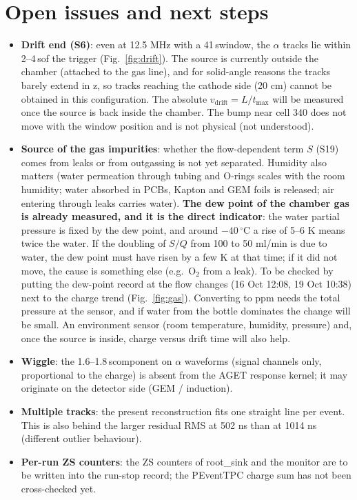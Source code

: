 \documentclass[a4paper,11pt]{article}
\newcommand{\us}{\,\textmu s}
\begin{document}
\section{Open issues and next steps}\label{sec:open}
\begin{itemize}
\item \textbf{Drift end (S6)}: even at 12.5 MHz with a 41\us window, the $\alpha$ tracks lie within 2--4\us of the trigger (Fig.~\ref{fig:drift}). The source is currently outside the chamber (attached to the gas line), and for solid-angle reasons the tracks barely extend in z, so tracks reaching the cathode side (20 cm) cannot be obtained in this configuration. The absolute $v_\mathrm{drift} = L / t_\mathrm{max}$ will be measured once the source is back inside the chamber. The bump near cell 340 does not move with the window position and is not physical (not understood).
\item \textbf{Source of the gas impurities}: whether the flow-dependent term $S$ (S19) comes from leaks or from outgassing is not yet separated. Humidity also matters (water permeation through tubing and O-rings scales with the room humidity; water absorbed in PCBs, Kapton and GEM foils is released; air entering through leaks carries water). \textbf{The dew point of the chamber gas is already measured, and it is the direct indicator}: the water partial pressure is fixed by the dew point, and around $-40\,^\circ$C a rise of 5--6 K means twice the water. If the doubling of $S/Q$ from 100 to 50 ml/min is due to water, the dew point must have risen by a few K at that time; if it did not move, the cause is something else (e.g.\ O$_2$ from a leak). To be checked by putting the dew-point record at the flow changes (16 Oct 12:08, 19 Oct 10:38) next to the charge trend (Fig.~\ref{fig:gas}). Converting to ppm needs the total pressure at the sensor, and if water from the bottle dominates the change will be small. An environment sensor (room temperature, humidity, pressure) and, once the source is inside, charge versus drift time will also help.
\item \textbf{Wiggle}: the 1.6--1.8\us component on $\alpha$ waveforms (signal channels only, proportional to the charge) is absent from the AGET response kernel; it may originate on the detector side (GEM / induction).
\item \textbf{Multiple tracks}: the present reconstruction fits one straight line per event. This is also behind the larger residual RMS at 502 ns than at 1014 ns (different outlier behaviour).
\item \textbf{Per-run ZS counters}: the ZS counters of root\_sink and the monitor are to be written into the run-stop record; the PEventTPC charge sum has not been cross-checked yet.
\end{itemize}
\end{document}
